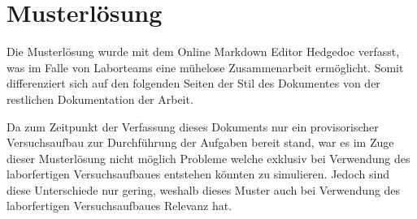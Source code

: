 \chapter{Musterlösung}

\label{muster}
Die Musterlösung wurde mit dem Online Markdown Editor Hedgedoc verfasst, was im Falle von Laborteams eine mühelose Zusammenarbeit ermöglicht.
Somit differenziert sich auf den folgenden Seiten der Stil des Dokumentes von der restlichen Dokumentation der Arbeit.

Da zum Zeitpunkt der Verfassung dieses Dokuments nur ein provisorischer Versuchsaufbau zur Durchführung der Aufgaben bereit stand, war es im Zuge dieser Musterlösung nicht möglich Probleme welche exklusiv bei Verwendung des laborfertigen Versuchsaufbaues entstehen könnten zu simulieren.
Jedoch sind diese Unterschiede nur gering, weshalb dieses Muster auch bei Verwendung des laborfertigen Versuchsaufbaues Relevanz hat.

